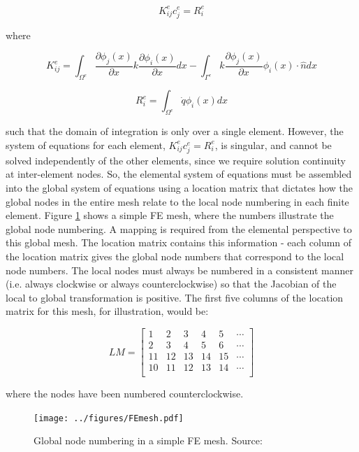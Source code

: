 \documentclass[10pt]{article}
\newcommand{\beq}{\begin{equation}}
\newcommand{\eeq}{\end{equation}}
\begin{document}
\beq
K_{ij}^ec_j^e=R_i^e
\eeq

where

\beq
K_{ij}^e=\int_{\Omega^e}\frac{\partial \phi_j(x)}{\partial x}k\frac{\partial\phi_i(x)}{\partial x}dx-\int_{\Gamma^e}k\frac{\partial \phi_j(x)}{\partial x}\phi_i(x)\cdot\hat{n}dx
\eeq

\beq
R_{i}^e=\int_{\Omega^e}\dot{q}\phi_i(x)dx
\eeq

such that the domain of integration is only over a single element. However, the system of equations for each element, \(K_{ij}^ec_j^e=R_i^e\), is singular, and cannot be solved independently of the other elements, since we require solution continuity at inter-element nodes. So, the elemental system of equations must be assembled into the global system of equations using a location matrix that dictates how the global nodes in the entire mesh relate to the local node numbering in each finite element. Figure \ref{fig:FEmesh} shows a simple FE mesh, where the numbers illustrate the global node numbering. A mapping is required from the elemental perspective to this global mesh. The location matrix contains this information - each column of the location matrix gives the global node numbers that correspond to the local node numbers. The local nodes must always be numbered in a consistent manner (i.e. always clockwise or always counterclockwise) so that the Jacobian of the local to global transformation is positive. The first five columns of the location matrix for this mesh, for illustration, would be:

\beq
\label{eq:LM}
LM=\begin{bmatrix}
1 & 2 & 3 & 4 & 5 & \cdots\\
2 & 3 & 4 & 5 & 6 & \cdots\\
11 & 12 & 13 & 14 & 15 & \cdots\\
10 & 11 & 12 & 13 & 14 & \cdots\\
\end{bmatrix}
\eeq

where the nodes have been numbered counterclockwise.

\begin{figure}[H]
\centering
\texttt{[image: ../figures/FEmesh.pdf]}
\caption{Global node numbering in a simple FE mesh. Source:}
\label{fig:FEmesh}
\end{figure}
\end{document}
